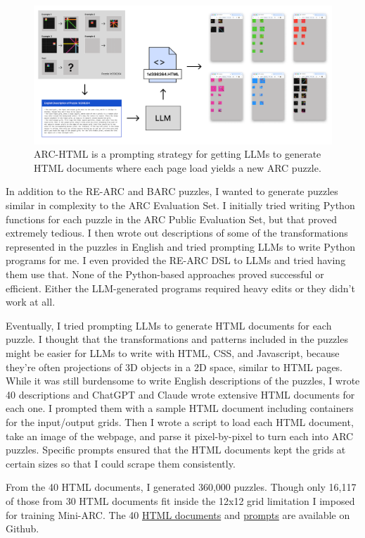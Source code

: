 \documentclass[10pt,twocolumn]{article}
\begin{document}
\begin{figure}[h!]
  \centering
  \includegraphics[width=\textwidth]{figures/html.png}
  \caption{ARC-HTML is a prompting strategy for getting LLMs to
  generate HTML documents where each page load yields a new ARC puzzle.}
  \label{fig:html}
\end{figure}

In addition to the RE-ARC and BARC puzzles, I wanted to generate
puzzles similar in complexity to the ARC Evaluation Set. I initially
tried writing Python functions for each puzzle in the
ARC Public Evaluation Set, but that proved extremely tedious. I then
wrote out descriptions of some of the transformations represented in
the puzzles in English and tried prompting LLMs to
write Python programs for me. I even provided the RE-ARC DSL to LLMs
and tried having them use that. None of the Python-based approaches
proved successful or efficient. Either the
LLM-generated programs required heavy edits or they didn't work at all.

Eventually, I tried prompting LLMs to generate HTML
documents for each puzzle. I thought that the transformations and
patterns included in the puzzles might be easier for LLMs to write
with HTML, CSS, and Javascript, because they're often projections of
3D objects in a 2D space, similar to HTML pages. While it was still
burdensome to write English descriptions of the puzzles, I wrote 40
descriptions and ChatGPT and Claude wrote extensive HTML documents
for each one. I prompted them with a sample HTML document including
containers for the input/output grids. Then I wrote a script to load
each HTML document, take an image of the webpage, and parse it
pixel-by-pixel to turn each into ARC puzzles. Specific prompts
ensured that the HTML documents kept the grids at certain sizes so
that I could scrape them consistently.

From the 40 HTML documents, I generated 360,000 puzzles. Though only
16,117 of those from 30 HTML documents fit inside the 12x12 grid
limitation I imposed for training Mini-ARC. The 40
\href{https://github.com/pfletcherhill/mini-arc/tree/main/html}{HTML
documents}
and
\href{https://github.com/pfletcherhill/mini-arc/tree/main/prompts}{prompts} are
available on Github.
\end{document}

